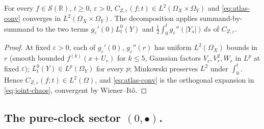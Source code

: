 \documentclass[EJP]{ejpecp}
\newcommand{\R}{\mathbb{R}}
\newcommand{\IBM}{Z}
\begin{document}
\begin{theorem}
\label{thm:atlas}
For every $f\in\mathscr S(\R)$, $t\ge 0$, $\varepsilon>0$,
$C_{\IBM,\varepsilon}(f;t)\in L^{2}(\Omega_X\times\Omega_Y)$ and
\eqref{eq:atlas-conv} converges in $L^{2}(\Omega_X\times\Omega_Y)$.
The decomposition applies summand-by-summand to the two terms
$g_\varepsilon'(0)L_t^0(Y)$ and
$\tfrac12\!\int_0^t g_\varepsilon''(|Y_s|)\,ds$ of
$C_{\IBM,\varepsilon}$.
\end{theorem}

\begin{proof}
At fixed $\varepsilon>0$, each of $g_\varepsilon'(0)$,
$g_\varepsilon''(r)$ has uniform $L^{2}(\Omega_X)$ bounds in $r$
(smooth bounded $f^{(k)}(x+U_r)$ for $k\le 5$, Gaussian factors
$V_r,V_r^{2},W_r$ in $L^{p}$ at fixed $\varepsilon$);
$L_t^{0}(Y)\in L^{p}(\Omega_Y)$ for every $p$; Minkowski preserves
$L^{2}$ under $\int_0^t$. Hence $C_{\IBM,\varepsilon}(f;t)\in L^{2}(\Omega)$,
and \eqref{eq:atlas-conv} is the orthogonal expansion in
\eqref{eq:joint-chaos}, convergent by Wiener--It\^o.
\end{proof}

\subsection*{The pure-clock sector $(0,\bullet)$.}
\end{document}
